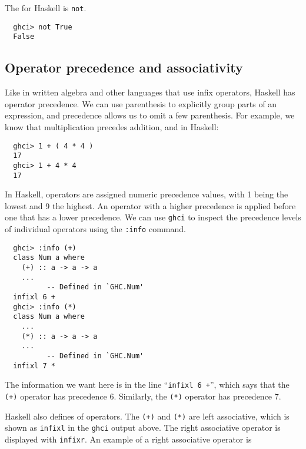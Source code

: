 \documentclass[notoc,notitlepage]{tufte-book}
\begin{document}
The  for Haskell is \texttt{not}.

\begin{lstlisting}
  ghci> not True
  False
\end{lstlisting}


\subsection{Operator precedence and associativity}%
\label{sub:operator_precedence_and_associativity}

Like in written algebra and other languages that use infix operators, Haskell has operator precedence. We can use parenthesis to explicitly group parts of an expression, and precedence allows us to omit a few parenthesis. For example, we know that multiplication precedes addition, and in Haskell:

\begin{lstlisting}
  ghci> 1 + ( 4 * 4 )
  17
  ghci> 1 + 4 * 4
  17
\end{lstlisting}

In Haskell, operators are assigned numeric precedence values, with 1 being the lowest and 9 the highest. An operator with a higher precedence is applied before one that has a lower precedence. We can use \texttt{ghci} to inspect the precedence levels of individual operators using the \texttt{:info} command.

\begin{lstlisting}
  ghci> :info (+)
  class Num a where
    (+) :: a -> a -> a
    ...
          -- Defined in `GHC.Num'
  infixl 6 +
  ghci> :info (*)
  class Num a where
    ...
    (*) :: a -> a -> a
    ...
          -- Defined in `GHC.Num'
  infixl 7 *
\end{lstlisting}

The information we want here is in the line ``\texttt{infixl 6 +}'', which says that the \texttt{(+)} operator has precedence 6. Similarly, the \texttt{(*)} operator has precedence 7.

Haskell also defines  of operators. The \texttt{(+)} and \texttt{(*)} are left associative, which is shown as \texttt{infixl} in the \texttt{ghci} output above. The right associative operator is displayed with \texttt{infixr}. An example of a right associative operator is
\end{document}
